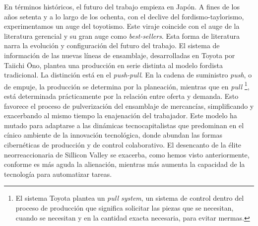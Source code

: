 En términos históricos, el futuro del trabajo empieza en Japón. A fines de los años setenta y a lo largo de los ochenta, con el declive del fordismo-taylorismo, experimentamos un auge del toyotismo. Este viraje coincide con el auge de la literatura gerencial y su gran auge como \emph{best-sellers}. Esta forma de literatura narra la evolución y configuración del futuro del trabajo. El sistema de información de las nuevas líneas de ensamblaje, desarrolladas en Toyota por Taiichi \={O}no, plantea una producción en serie distinta al modelo fordista tradicional. La distinción está en el \emph{push-pull}. En la cadena de suministro \emph{push}, o de empuje, la producción se determina por la planeación, mientras que en \emph{pull} \footnote{El sistema Toyota plantea un \emph{pull system}, un sistema de control dentro del proceso de producci\'{o}n que significa solicitar las piezas que se necesitan, cuando se necesitan y en la cantidad exacta necesaria, para evitar mermas.}, está determinada prácticamente por la relación entre oferta y demanda. Esto favorece el proceso de pulverización del ensamblaje de mercancías, simplificando y exacerbando al mismo tiempo la enajenación del trabajador. Este modelo ha mutado para adaptarse a las dinámicas tecnocapitalistas que predominan en el cínico ambiente de la innovación tecnológica, donde abundan las formas cibernéticas de producción y de control colaborativo. El desencanto de la élite neorreaccionaria de Sillicon Valley se exacerba, como hemos visto anteriormente, conforme es más aguda la alienación, mientras más aumenta la capacidad de la tecnología para automatizar tareas.

